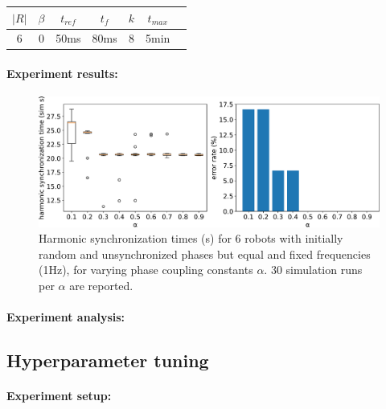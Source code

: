 		\begin{center}
		\begin{tabular}{ |c|c|c|c|c|c|c| } 
		\hline
		$|R|$ & $\beta$ & $t_{ref}$ & $t_f$ & $k$ & $t_{max}$ \\
		\hline
		6 & 0 & 50ms & 80ms & 8 & 5min \\
		\hline
		\end{tabular}
		\label{tab:baseline_reproducing_phase_sync_for_alpha}
		\end{center}
		
		\paragraph{Experiment results:\nl}
		
		\begin{figure}[ht!]
			\centering
			\includegraphics[width=\linewidth]{Assets/DocSegments/Chapters/ExperimentsAndResults/Figures/PerfScores/baseline_reproducing_phase_sync_for_alpha.pdf}
			\caption[Experiment results for $\phi$ synchronization baseline reproduction experiment.]{Harmonic synchronization times (s) for 6 robots with initially random and unsynchronized phases but equal and fixed frequencies (1Hz), for varying phase coupling constants $\alpha$. 30 simulation runs per $\alpha$ are reported.}
			\label{fig:baseline_reproducing_phase_sync_for_alpha}
		\end{figure}
		
		\paragraph{Experiment analysis:\nl}
	
	\subsection{Hyperparameter tuning}
	
		\paragraph{Experiment setup:\nl}
		
